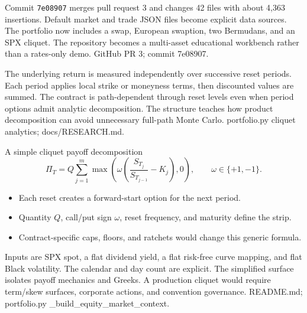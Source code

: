 
{Commit \texttt{7e08907} merges pull request 3 and changes 42 files with about 4,363 insertions.}
{Default market and trade JSON files become explicit data sources.}
{The portfolio now includes a swap, European swaption, two Bermudans, and an SPX cliquet.}
{The repository becomes a multi-asset educational workbench rather than a rates-only demo.}
{GitHub PR 3; commit 7e08907.}

{The underlying return is measured independently over successive reset periods.}
{Each period applies local strike or moneyness terms, then discounted values are summed.}
{The contract is path-dependent through reset levels even when period options admit analytic decomposition.}
{The structure teaches how product decomposition can avoid unnecessary full-path Monte Carlo.}
{portfolio.py cliquet analytics; docs/RESEARCH.md.}

\begin{frame}{A simple cliquet payoff decomposition}
  \[
    \Pi_T = Q\sum_{j=1}^{m}\max\!\left(\omega\left(\frac{S_{T_j}}{S_{T_{j-1}}}-K_j\right),0\right),
    \qquad \omega\in\{+1,-1\}.
  \]
  \begin{itemize}\setlength\itemsep{0.8em}
    \item Each reset creates a forward-start option for the next period.
    \item Quantity $Q$, call/put sign $\omega$, reset frequency, and maturity define the strip.
    \item Contract-specific caps, floors, and ratchets would change this generic formula.
  \end{itemize}
\end{frame}

{Inputs are SPX spot, a flat dividend yield, a flat risk-free curve mapping, and flat Black volatility.}
{The calendar and day count are explicit.}
{The simplified surface isolates payoff mechanics and Greeks.}
{A production cliquet would require term/skew surfaces, corporate actions, and convention governance.}
{README.md; portfolio.py \_build\_equity\_market\_context.}

